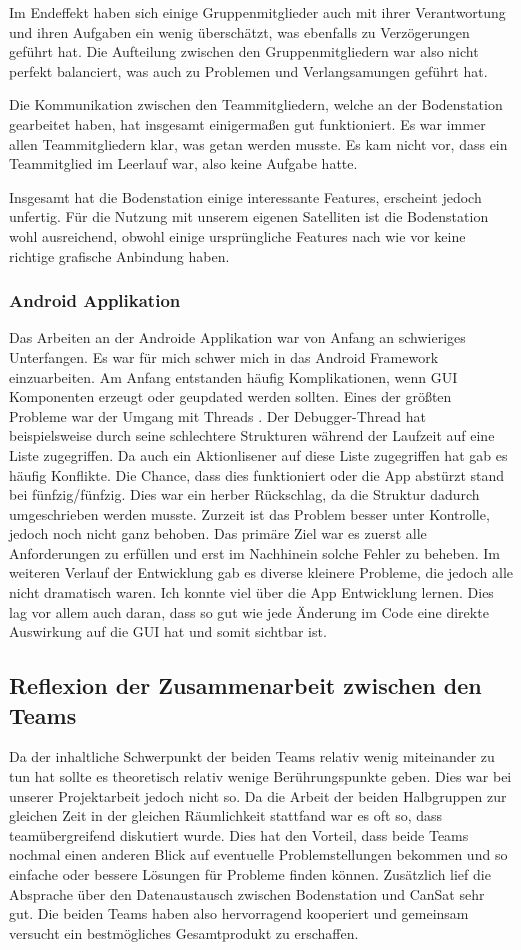 Im Endeffekt haben sich einige Gruppenmitglieder auch mit ihrer Verantwortung und ihren Aufgaben ein wenig überschätzt, was ebenfalls zu Verzögerungen geführt hat. Die Aufteilung zwischen den Gruppenmitgliedern war also nicht perfekt balanciert, was auch zu Problemen und Verlangsamungen geführt hat.

Die Kommunikation zwischen den Teammitgliedern, welche an der Bodenstation gearbeitet haben, hat insgesamt einigermaßen gut funktioniert. Es war immer allen Teammitgliedern klar, was getan werden musste. Es kam nicht vor, dass ein Teammitglied im Leerlauf war, also keine Aufgabe hatte.

Insgesamt hat die Bodenstation einige interessante Features, erscheint jedoch unfertig. Für die Nutzung mit unserem eigenen Satelliten ist die Bodenstation wohl ausreichend, obwohl einige ursprüngliche Features nach wie vor keine richtige grafische Anbindung haben.

\subsubsection{Android Applikation}
Das Arbeiten an der Androide Applikation war von Anfang an schwieriges Unterfangen. Es war für mich schwer mich in das Android Framework einzuarbeiten. Am Anfang entstanden häufig Komplikationen, wenn GUI Komponenten erzeugt oder geupdated werden sollten. Eines der größten Probleme war der Umgang mit Threads . Der Debugger-Thread hat beispielsweise durch seine schlechtere Strukturen während der Laufzeit auf eine Liste zugegriffen. Da auch ein Aktionlisener auf diese Liste zugegriffen hat gab es häufig Konflikte. Die Chance, dass dies funktioniert oder die App abstürzt stand bei fünfzig/fünfzig. Dies war ein herber Rückschlag, da die Struktur dadurch umgeschrieben werden musste. Zurzeit ist das Problem besser unter Kontrolle, jedoch noch nicht ganz behoben. Das primäre Ziel war es zuerst alle Anforderungen zu erfüllen und erst im Nachhinein solche Fehler zu beheben. Im weiteren Verlauf der Entwicklung gab es diverse kleinere Probleme, die jedoch alle nicht dramatisch waren. Ich konnte viel über die App Entwicklung lernen. Dies lag vor allem auch daran, dass so gut wie jede Änderung im Code eine direkte Auswirkung auf die GUI hat und somit sichtbar ist.

\subsection{Reflexion der Zusammenarbeit zwischen den Teams}
Da der inhaltliche Schwerpunkt der beiden Teams relativ wenig miteinander zu tun hat sollte es theoretisch relativ wenige Berührungspunkte geben. Dies war bei unserer Projektarbeit jedoch nicht so. Da die Arbeit der beiden Halbgruppen zur gleichen Zeit in der gleichen Räumlichkeit stattfand war es oft so, dass teamübergreifend  diskutiert wurde. Dies hat den Vorteil, dass beide Teams nochmal einen anderen Blick auf eventuelle Problemstellungen bekommen und so einfache oder bessere Lösungen für Probleme finden können. Zusätzlich lief die Absprache über den Datenaustausch zwischen Bodenstation und CanSat sehr gut. Die beiden Teams haben also hervorragend kooperiert und gemeinsam versucht ein bestmögliches Gesamtprodukt zu erschaffen.
